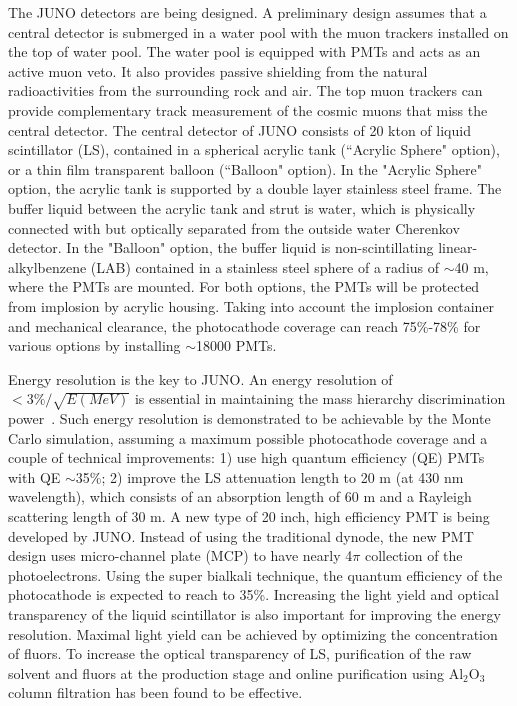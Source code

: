 The JUNO detectors are being designed. A preliminary design assumes that a central detector is submerged in a water pool with the muon trackers installed on the top of water pool. The water pool is equipped with PMTs and acts as an active muon veto. It also provides passive shielding from the natural radioactivities from the surrounding rock and air. The top muon trackers can provide complementary track measurement of the cosmic muons that miss the central detector. The central detector of JUNO consists of 20 kton of liquid scintillator (LS), contained in a spherical acrylic tank (``Acrylic Sphere" option), or a thin film transparent balloon (``Balloon" option). In the "Acrylic Sphere" option, the acrylic tank is supported by a double layer stainless steel frame. The buffer liquid between the acrylic tank and strut is water, which is physically connected with but optically separated from the outside water Cherenkov detector. In the "Balloon" option, the buffer liquid is non-scintillating linear-alkylbenzene (LAB) contained in a stainless steel sphere of a radius of $\sim $40 m, where the PMTs are mounted. For both options, the PMTs will be protected from implosion by acrylic housing. Taking into account the implosion container and mechanical clearance, the photocathode coverage can reach 75\%-78\% for various options by installing $\sim$18000 PMTs.

Energy resolution is the key to JUNO. An energy resolution of $<3\%/\sqrt{E(MeV)}$ is essential in maintaining the mass hierarchy discrimination power~\cite{Li-PRD13}. Such energy resolution is demonstrated to be achievable by the Monte Carlo simulation, assuming a maximum possible photocathode coverage and a couple of technical improvements: 1) use high quantum efficiency (QE) PMTs with QE $\sim$35\%; 2) improve the LS attenuation length to 20 m (at 430 nm wavelength), which consists of an absorption length of 60 m and a Rayleigh scattering length of 30 m. A new type of 20 inch, high efficiency PMT is being developed by JUNO. Instead of using the traditional dynode, the new PMT design uses micro-channel plate (MCP) to have nearly 4$\pi$ collection of the photoelectrons. Using the super bialkali technique, the quantum efficiency of the photocathode is expected to reach to 35\%. Increasing the light yield and optical transparency of the liquid scintillator is also important for improving the energy resolution. Maximal light yield can be achieved by optimizing the concentration of fluors. To increase the optical transparency of LS, purification of the raw solvent and fluors at the production stage and online purification using Al$_2$O$_3$ column filtration has been found to be effective.

